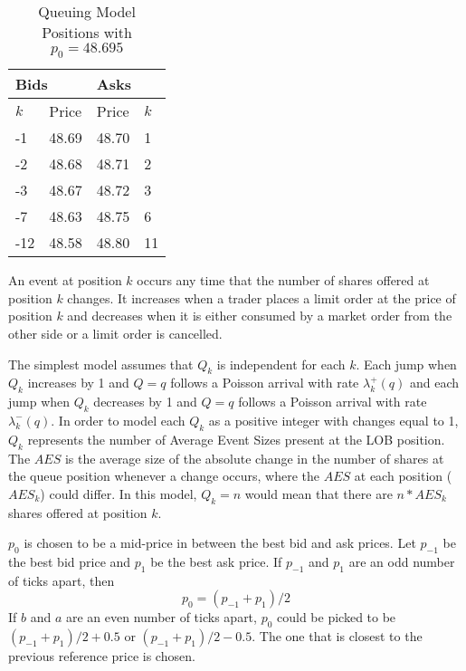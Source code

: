 \begin{table}[htbp]
\caption{Queuing Model Positions with $p_0 = 48.695$} \label{tab:queue_positions}
\begin{center}
\begin{tabular}{ll|ll}
\hline \hline
\multicolumn{2}{l|}{\textbf{Bids}} & \multicolumn{2}{l}{\textbf{Asks}} \\
\hline
$k$          & Price          & Price           & $k$          \\
\hline
-1             & 48.69          & 48.70           & 1             \\
-2             & 48.68          & 48.71           & 2            \\
-3             & 48.67          & 48.72           & 3            \\
-7             & 48.63          & 48.75           & 6            \\
-12             & 48.58          & 48.80           & 11          
\end{tabular}
\end{center}
\end{table}

An event at position $k$ occurs any time that the number of shares offered at position $k$ changes. It increases when a trader places a limit order at the price of position $k$ and decreases when it is either consumed by a market order from the other side or a limit order is cancelled.

The simplest model assumes that $Q_k$ is independent for each $k$. Each jump when $Q_k$ increases by 1 and $Q = q$ follows a Poisson arrival with rate $\lambda^+_k(q)$ and each jump when $Q_k$ decreases by 1 and $Q = q$ follows a Poisson arrival with rate $\lambda^-_k(q)$. In order to model each $Q_k$ as a positive integer with changes equal to 1, $Q_k$ represents the number of Average Event Sizes present at the LOB position. The $AES$ is the average size of the absolute change in the number of shares at the queue position whenever a change occurs, where the $AES$ at each position ($AES_k$) could differ. In this model, $Q_k = n$ would mean that there are $n*AES_k$ shares offered at position $k$.

$p_0$ is chosen to be a mid-price in between the best bid and ask prices. Let $p_{-1}$ be the best bid price and $p_1$ be the best ask price. If $p_{-1}$ and $p_1$ are an odd number of ticks apart, then 
$$p_0=  (p_{-1}+p_1)/2$$
If $b$ and $a$ are an even number of ticks apart, $p_0$ could be picked to be $(p_{-1}+p_1)/2 + 0.5$ or $(p_{-1}+p_1)/2 - 0.5$. The one that is closest to the previous reference price is chosen.

